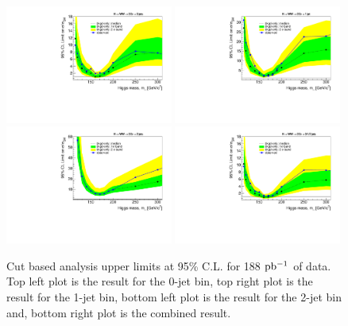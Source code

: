 \begin{figure}[!htbp]
\begin{center}
   \includegraphics[width=0.49\textwidth]{figures/limits_0j_200pb_cut_1.pdf}
   \includegraphics[width=0.49\textwidth]{figures/limits_1j_200pb_cut_1.pdf}
   \includegraphics[width=0.49\textwidth]{figures/limits_2j_200pb_cut_1.pdf}
   \includegraphics[width=0.49\textwidth]{figures/limits_nj_200pb_cut_1.pdf}
   \caption{Cut based analysis upper limits at 95\% C.L. for 188 $\mathrm{pb^{-1}}$ of data. Top left plot 
   is the result for the 0-jet bin, top right plot is the result for the 1-jet bin, bottom left plot 
   is the result for the 2-jet bin and, bottom right plot is the combined result.}
   \label{fig:cutbase_uls_data}
\end{center}
\end{figure}


